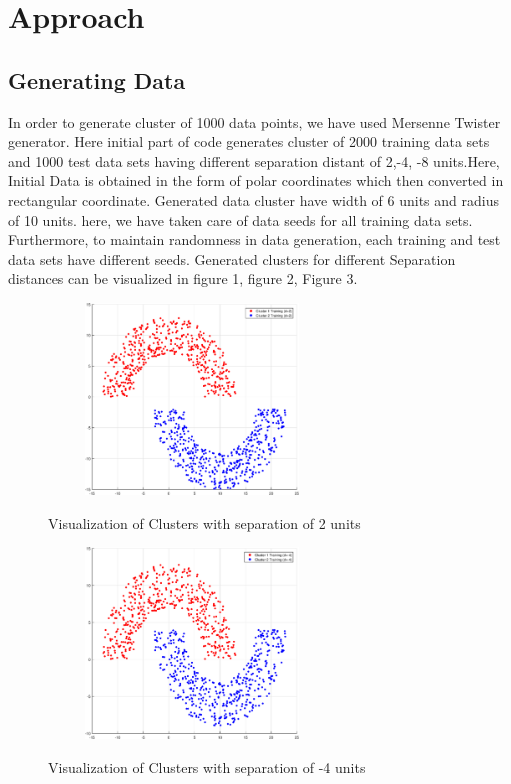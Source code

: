 \documentclass[conference]{IEEEtran}
\begin{document}
\section{Approach}

\subsection{Generating Data}
In order to generate cluster of 1000 data points, we have used Mersenne Twister \cite{twister} generator. Here initial part of code generates cluster of 2000 training  data sets and 1000 test data sets having different separation distant of 2,-4, -8 units.Here, Initial Data is obtained in the form of polar coordinates which then converted in rectangular coordinate. Generated data cluster have width of 6 units and radius of 10 units. here, we have taken care of data seeds for all training data sets. Furthermore, to maintain randomness in data generation, each training and test data sets have different seeds\cite{rng}. Generated clusters for different Separation distances can be visualized in figure 1, figure 2, Figure 3. 
\begin{figure}
\centering
{\includegraphics[width=3in,height=2in,clip,keepaspectratio]{ClustersD2.eps} }\\
\caption{ Visualization of Clusters with separation of 2 units}
\end{figure}

\begin{figure}
\centering
{\includegraphics[width=3in,height=2in,clip,keepaspectratio]{ClustersDn4.eps} }\\
\caption{ Visualization of Clusters with separation of -4 units}
\end{figure}
\end{document}
